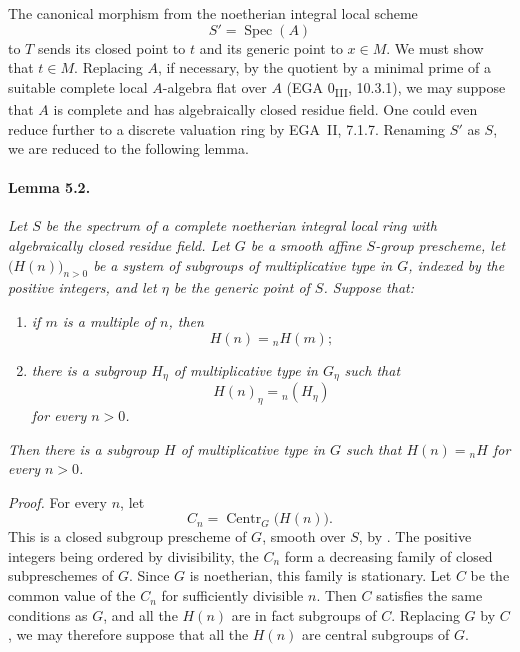 The canonical morphism from the noetherian integral local scheme
\[
  S'=\operatorname{Spec}(A)
\]
to \(T\) sends its closed point to \(t\) and its generic point to
\(x\in M\). We must show that \(t\in M\). Replacing \(A\), if
necessary, by the quotient by a minimal prime of a suitable complete
local \(A\)-algebra flat over \(A\) \textup{(EGA
0\textsubscript{III}, 10.3.1)}, we may suppose that \(A\) is
complete and has algebraically closed residue field. One could even
reduce further to a discrete valuation ring by EGA~II, 7.1.7.
Renaming \(S'\) as \(S\), we are reduced to the following lemma.

\paragraph{\textbf{Lemma 5.2.}}
\emph{Let \(S\) be the spectrum of a complete noetherian integral
local ring with algebraically closed residue field. Let \(G\) be a
smooth affine \(S\)-group prescheme, let
\(\bigl(H(n)\bigr)_{n>0}\) be a system of subgroups of
multiplicative type in \(G\), indexed by the positive integers, and
let \(\eta\) be the generic point of \(S\). Suppose that:}

\begin{enumerate}
\item[\textup{(a)}] \emph{if \(m\) is a multiple of \(n\), then
\[
  H(n)={}_nH(m);
\]}
\item[\textup{\SGAInlineRefTarget{sga3:xii:5.2:item:b}(b)}] \emph{there is a subgroup \(H_\eta\) of
multiplicative type in \(G_\eta\) such that
\[
  H(n)_\eta={}_n(H_\eta)
\]
for every \(n>0\).}
\end{enumerate}

\emph{Then there is a subgroup \(H\) of multiplicative type in
\(G\) such that \(H(n)={}_nH\) for every \(n>0\).}

\emph{Proof.}
For every \(n\), let
\[
  C_n=\operatorname{Centr}_G\bigl(H(n)\bigr).
\]
This is a closed subgroup prescheme of \(G\), smooth over \(S\), by
. The positive integers being ordered by divisibility, the
\(C_n\) form a decreasing family of closed subpreschemes of \(G\).
Since \(G\) is noetherian, this family is stationary. Let \(C\) be
the common value of the \(C_n\) for sufficiently divisible \(n\).
Then \(C\) satisfies the same conditions as \(G\), and all the
\(H(n)\) are in fact subgroups of \(C\). Replacing \(G\) by \(C\),
we may therefore suppose that all the \(H(n)\) are central subgroups
of \(G\).

